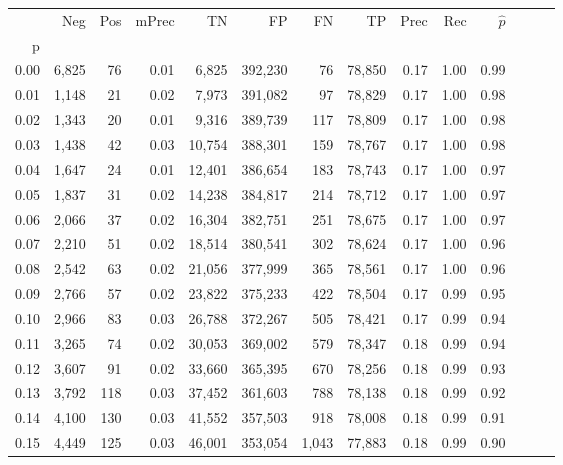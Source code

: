 \begin{tabular}{rrrrrrrrrrrrrr}
\toprule
{} &    Neg &    Pos & mPrec &       TN &       FP &      FN &      TP &  Prec &   Rec & $\hat{p}$ \\
p    &        &        &       &          &          &         &         &       &       &           \\
\midrule
0.00 &  6,825 &     76 &  0.01 &    6,825 &  392,230 &      76 &  78,850 &  0.17 &  1.00 &      0.99 \\
0.01 &  1,148 &     21 &  0.02 &    7,973 &  391,082 &      97 &  78,829 &  0.17 &  1.00 &      0.98 \\
0.02 &  1,343 &     20 &  0.01 &    9,316 &  389,739 &     117 &  78,809 &  0.17 &  1.00 &      0.98 \\
0.03 &  1,438 &     42 &  0.03 &   10,754 &  388,301 &     159 &  78,767 &  0.17 &  1.00 &      0.98 \\
0.04 &  1,647 &     24 &  0.01 &   12,401 &  386,654 &     183 &  78,743 &  0.17 &  1.00 &      0.97 \\
0.05 &  1,837 &     31 &  0.02 &   14,238 &  384,817 &     214 &  78,712 &  0.17 &  1.00 &      0.97 \\
0.06 &  2,066 &     37 &  0.02 &   16,304 &  382,751 &     251 &  78,675 &  0.17 &  1.00 &      0.97 \\
0.07 &  2,210 &     51 &  0.02 &   18,514 &  380,541 &     302 &  78,624 &  0.17 &  1.00 &      0.96 \\
0.08 &  2,542 &     63 &  0.02 &   21,056 &  377,999 &     365 &  78,561 &  0.17 &  1.00 &      0.96 \\
0.09 &  2,766 &     57 &  0.02 &   23,822 &  375,233 &     422 &  78,504 &  0.17 &  0.99 &      0.95 \\
0.10 &  2,966 &     83 &  0.03 &   26,788 &  372,267 &     505 &  78,421 &  0.17 &  0.99 &      0.94 \\
0.11 &  3,265 &     74 &  0.02 &   30,053 &  369,002 &     579 &  78,347 &  0.18 &  0.99 &      0.94 \\
0.12 &  3,607 &     91 &  0.02 &   33,660 &  365,395 &     670 &  78,256 &  0.18 &  0.99 &      0.93 \\
0.13 &  3,792 &    118 &  0.03 &   37,452 &  361,603 &     788 &  78,138 &  0.18 &  0.99 &      0.92 \\
0.14 &  4,100 &    130 &  0.03 &   41,552 &  357,503 &     918 &  78,008 &  0.18 &  0.99 &      0.91 \\
0.15 &  4,449 &    125 &  0.03 &   46,001 &  353,054 &   1,043 &  77,883 &  0.18 &  0.99 &      0.90 \\

\end{tabular}
